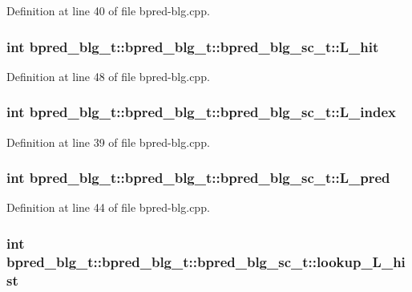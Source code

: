 Definition at line 40 of file bpred-blg.cpp.
\subsubsection[{L\_\-hit}]{\setlength{\rightskip}{0pt plus 5cm}int bpred\_\-blg\_\-t::bpred\_\-blg\_\-t::bpred\_\-blg\_\-sc\_\-t::L\_\-hit}\label{classbpred__blg__t_1_1bpred__blg__sc__t_ab311cfd2bdd914130e7237950d15e09}




Definition at line 48 of file bpred-blg.cpp.
\subsubsection[{L\_\-index}]{\setlength{\rightskip}{0pt plus 5cm}int bpred\_\-blg\_\-t::bpred\_\-blg\_\-t::bpred\_\-blg\_\-sc\_\-t::L\_\-index}\label{classbpred__blg__t_1_1bpred__blg__sc__t_7782300581812440e98daefdc29d47d6}




Definition at line 39 of file bpred-blg.cpp.
\subsubsection[{L\_\-pred}]{\setlength{\rightskip}{0pt plus 5cm}int bpred\_\-blg\_\-t::bpred\_\-blg\_\-t::bpred\_\-blg\_\-sc\_\-t::L\_\-pred}\label{classbpred__blg__t_1_1bpred__blg__sc__t_0b5d0c201c7097b744f2c98c9c7b6e17}




Definition at line 44 of file bpred-blg.cpp.
\subsubsection[{lookup\_\-L\_\-hist}]{\setlength{\rightskip}{0pt plus 5cm}int bpred\_\-blg\_\-t::bpred\_\-blg\_\-t::bpred\_\-blg\_\-sc\_\-t::lookup\_\-L\_\-hist}\label{classbpred__blg__t_1_1bpred__blg__sc__t_a443ef2913c245a36c5d3f3efc275bf5}





